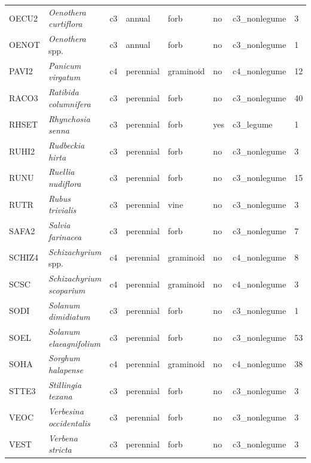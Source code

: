 \begin{landscape}
\begin{table}[]
{\begin{tabular}{p{2cm}p{5cm}p{2cm}p{2cm}p{2cm}p{2cm}p{3.5cm}p{2cm}}
        OECU2  & \textit{Oenothera curtiflora}      & c3 & annual    & forb           & no  & c3\_nonlegume & 3  \\
        OENOT  & \textit{Oenothera} spp.            & c3 & annual    & forb           & no  & c3\_nonlegume & 1  \\
        PAVI2  & \textit{Panicum virgatum}          & c4 & perennial & graminoid      & no  & c4\_nonlegume & 12 \\
        RACO3  & \textit{Ratibida columnifera}      & c3 & perennial & forb           & no  & c3\_nonlegume & 40 \\
        RHSET  & \textit{Rhynchosia senna}          & c3 & perennial & forb           & yes & c3\_legume    & 1  \\
        RUHI2  & \textit{Rudbeckia hirta}           & c3 & perennial & forb           & no  & c3\_nonlegume & 3  \\
        RUNU   & \textit{Ruellia nudiflora}         & c3 & perennial & forb           & no  & c3\_nonlegume & 15 \\
        RUTR   & \textit{Rubus trivialis}           & c3 & perennial & vine           & no  & c3\_nonlegume & 3  \\
        SAFA2  & \textit{Salvia farinacea}          & c3 & perennial & forb           & no  & c3\_nonlegume & 7  \\
        SCHIZ4 & \textit{Schizachyrium} spp.        & c4 & perennial & graminoid      & no  & c4\_nonlegume & 8  \\
        SCSC   & \textit{Schizachyrium scoparium}   & c4 & perennial & graminoid      & no  & c4\_nonlegume & 3  \\
        SODI   & \textit{Solanum dimidiatum}        & c3 & perennial & forb           & no  & c3\_nonlegume & 1  \\
        SOEL   & \textit{Solanum elaeagnifolium}    & c3 & perennial & forb           & no  & c3\_nonlegume & 53 \\
        SOHA   & \textit{Sorghum halapense}         & c4 & perennial & graminoid      & no  & c4\_nonlegume & 38 \\
        STTE3  & \textit{Stillingia texana}         & c3 & perennial & forb           & no  & c3\_nonlegume & 3  \\
        VEOC   & \textit{Verbesina occidentalis}    & c3 & perennial & forb           & no  & c3\_nonlegume & 3  \\
        VEST   & \textit{Verbena stricta}           & c3 & perennial & forb           & no  & c3\_nonlegume & 3  \\
        \hline
    \end{tabular}}
\end{table}
\end{landscape}
\clearpage

